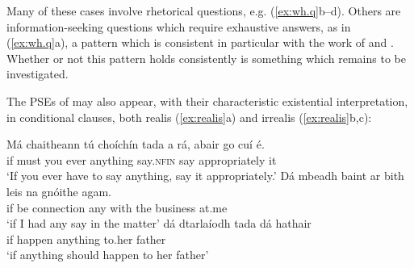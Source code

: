 \documentclass[output=paper,colorlinks,citecolor=brown]{langscibook}
\begin{document}
\noindent Many of these cases involve rhetorical questions, e.g. (\ref{ex:wh.q}b--d). Others are infor\-mat\-ion-seeking questions which require exhaustive answers, as in (\ref{ex:wh.q}a), a pattern which is consistent in particular with the work of \citet{guerzoni-sharvit:07} and \citet{mayr:13}.  Whether or not this pattern holds consistently is something which remains to be investigated.


The PSEs of  may also appear, with their characteristic existential interpretation, in conditional clauses, both realis (\ref{ex:realis}a) and irrealis (\ref{ex:realis}b,c):

\ea\label{ex:realis}
\ea
\gll Má chaitheann tú choíchín tada {a rá}, abair {go cuí} é.\\ %
    if {must\pres} you ever anything {say.\textsc{nfin}} {say\impv} appropriately it\\
\glt `If you ever have to say anything, say it appropriately.'
\ex
\gll Dá mbeadh baint {ar bith} leis na gnóithe agam. \\
    if {be\cond} connection any  with the business at.me \\
\glt `if I had any say in the matter'
\ex
\gll dá dtarlaíodh tada dá hathair \\
     if {happen\cond} anything {to.her} father \\
\glt `if anything should happen to her father'
\z
\z
{}

\end{document}
